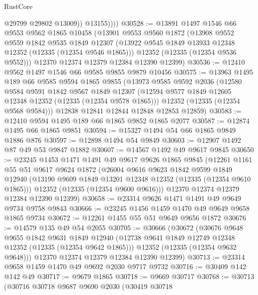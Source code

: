 \begin{lexlean}{RustCore}
\begin{coremodule}
                @29799
                @29802
                @13009))
            @13155))))
@30528 := @13891
    @1497
    @1546
    @66
    @9553
    @9562
    @1865
    @10458
    (@13901
      @9553
      @9560
      @1872
      (@13908
        @9552
        @9559
        @1842
        @9535
        @1849
        @12307
        (@13922 @9545 @1849 @13933 @12348 @12352 (@12335 (@12354 @9546 @1865)))
        @12352
        (@12335 (@12354 @9536 @9552)))
      @12370
      @12374
      @12379
      @12384
      @12390
      @12399)
@30536 := @12410 @9562 @1497 @1546 @66 @9585 @9855 @9879 @10456
@30575 := @13963
    @1495
    @189
    @66
    @9585
    @9594
    @1865
    @9855
    (@13973
      @9585
      @9592
      @2036
      (@12580
        @9584
        @9591
        @1842
        @9567
        @1849
        @12307
        (@12594 @9577 @1849 @12605 @12348 @12352 (@12335 (@12354 @9578 @1865)))
        @12352
        (@12335 (@12354 @9568 @9584)))
      @12838
      @12841
      @12844
      @12848
      @12853
      @12859)
@30583 := @12410 @9594 @1495 @189 @66 @1865 @9852 @1865 @2077
@30587 := @12874 @1495 @66 @1865 @9851
@30594 := @15327 @1494 @54 @66 @1865 @9849 @1886 @876
@30597 := @12898 @1494 @54 @9849
@30603 := @12907 @1492 @87 @49 @53 @9847 @1882
@30607 := @14567 @1492 @49 @9617 @9845
@30650 := @23245
    @1453
    @1471
    @1491
    @49
    @9617
    @9626
    @1865
    @9845
    (@12261
      @1161
      @55
      @51
      @9617
      @9624
      @1872
      (@26004
        @9616
        @9623
        @1842
        @9599
        @1849
        @12940
        (@13190 @9609 @1849 @13201 @12348 @12352 (@12335 (@12354 @9610 @1865)))
        @12352
        (@12335 (@12354 @9600 @9616)))
      @12370
      @12374
      @12379
      @12384
      @12390
      @12399)
@30658 := @23314 @9626 @1471 @1491 @49 @9649 @9734 @9758 @9843
@30666 := @23245 @1456 @1459 @1470 @49 @9649 @9658 @1865 @9734
@30672 := @12261 @1455 @55 @51 @9649 @9656 @1872
@30676 := @14579 @135 @49 @54 @2055
@30705 := @30666
    (@30672
      (@30676
        @9648
        @9655
        @1842
        @9631
        @1849
        @12940
        (@12738 @9641 @1849 @12749 @12348 @12352 (@12335 (@12354 @9642 @1865)))
        @12352
        (@12335 (@12354 @9632 @9648)))
      @12370
      @12374
      @12379
      @12384
      @12390
      @12399)
@30713 := @23314 @9658 @1459 @1470 @49 @9692 @2030 @9717 @9732
@30716 := @30409 @142 @142 @49
@30717 := @9679 @1865
@30718 := @9669 @30717
@30768 := @30713
    (@30716
      @30718
      @9687
      @9690
      @2030
      (@30419
        @30718

\end{coremodule}
\end{lexlean}
